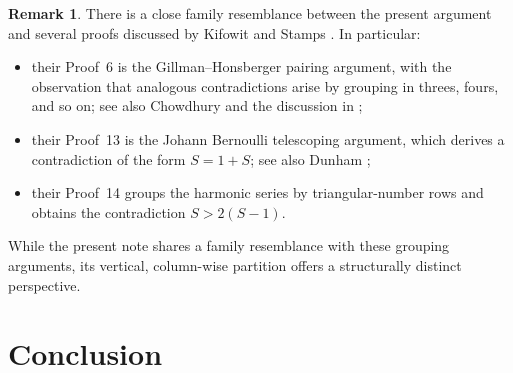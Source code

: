 \documentclass{article}
\theoremstyle{theorem}
\theoremstyle{definition}
\newtheorem{remark}[theorem]{Remark}
\begin{document}
\begin{remark}
There is a close family resemblance between the present argument and several proofs discussed by Kifowit and Stamps \cite{KifowitStamps2006}. In particular:
\begin{itemize}
    \item their Proof~6 is the Gillman--Honsberger pairing argument, with the observation that analogous contradictions arise by grouping in threes, fours, and so on; see also Chowdhury \cite{Chowdhury1975} and the discussion in \cite{Kifowit2019};
    \item their Proof~13 is the Johann Bernoulli telescoping argument, which derives a contradiction of the form \(S = 1 + S\); see also Dunham \cite{Dunham1987};
    \item their Proof~14 groups the harmonic series by triangular-number rows and obtains the contradiction \(S > 2(S-1)\).
\end{itemize}
While the present note shares a family resemblance with these grouping arguments, its vertical, column-wise partition offers a structurally distinct perspective.
\end{remark}

\section{Conclusion}
\end{document}

